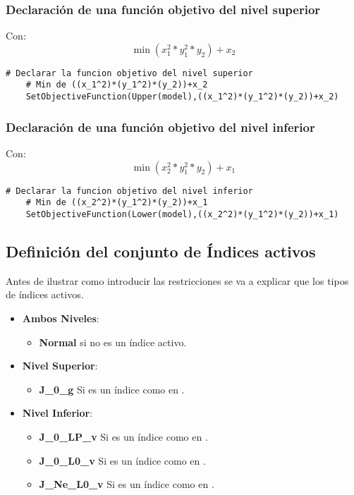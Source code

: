 \subsubsection{ Declaración de una función objetivo del nivel superior}
Con: $$\min (x_1^2*y_1^2*y_2) + x_2$$
\begin{lstlisting}[caption={ Declarar una función objetivo del nivel superior}]
    # Declarar la funcion objetivo del nivel superior
    # Min de ((x_1^2)*(y_1^2)*(y_2))+x_2
    SetObjectiveFunction(Upper(model),((x_1^2)*(y_1^2)*(y_2))+x_2)
\end{lstlisting}

\subsubsection{Declaración de una función objetivo del nivel inferior}

Con: $$\min (x_2^2*y_1^2*y_2)+x_1$$
\begin{lstlisting}[caption={Declarar una función objetivo del nivel inferior.}]
    # Declarar la funcion objetivo del nivel inferior
    # Min de ((x_2^2)*(y_1^2)*(y_2))+x_1
    SetObjectiveFunction(Lower(model),((x_2^2)*(y_1^2)*(y_2))+x_1)
\end{lstlisting}

\subsection{Definición del conjunto de Índices activos}
\begin{samepage}
Antes de ilustrar como introducir las restricciones se va a explicar 
que los tipos de índices activos.

\begin{itemize}
    \item \textbf{Ambos Niveles}:
        \begin{itemize}
            \item \textbf{Normal} si no es un índice activo.
        \end{itemize}
    \item \textbf{Nivel Superior}:
     \begin{itemize}
        \item \textbf{J\_0\_g} Si es un índice como en .
     \end{itemize}
    \item \textbf{Nivel Inferior}:
    \begin{itemize}
        \item \textbf{J\_0\_LP\_v} Si es un índice como en .
        \item  \textbf{J\_0\_L0\_v} Si es un índice como en .
        \item  \textbf{J\_Ne\_L0\_v} Si es un índice como en .
    \end{itemize}
\end{itemize}
\end{samepage}


